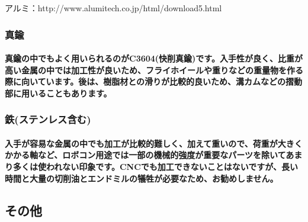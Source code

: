 \documentclass[b5paper, 9pt, twocolumn, titlepage,openany]{jsbook}%
\begin{document}

アルミ：http://www.alumitech.co.jp/html/download5.html

\subsubsection{真鍮}

\paragraph{真鍮の中でもよく用いられるのがC3604(快削真鍮)です。入手性が良く、比重が高い金属の中では加工性が良いため、フライホイールや重りなどの重量物を作る際に向いています。後は、樹脂材との滑りが比較的良いため、溝カムなどの摺動部に用いることもあります。}

\subsubsection{鉄(ステンレス含む)}

\paragraph{入手が容易な金属の中でも加工が比較的難しく、加えて重いので、荷重が大きくかかる軸など、ロボコン用途では一部の機械的強度が重要なパーツを除いてあまり多くは使われない印象です。CNCでも加工できないことはないですが、長い時間と大量の切削油とエンドミルの犠牲が必要なため、お勧めしません。}

\subsection{その他}
\end{document}
